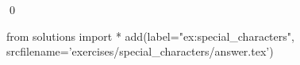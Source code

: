 
\begin{ex} 
  \label{ex:special_characters}
  
  \qed
\end{ex} 
\begin{python0}
from solutions import *
add(label="ex:special_characters",
    srcfilename='exercises/special_characters/answer.tex') 
\end{python0}
